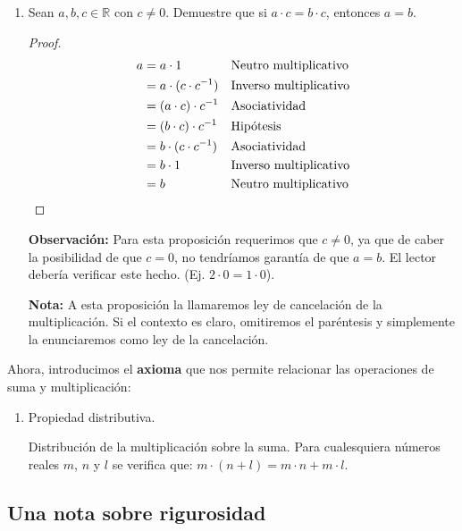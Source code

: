 \documentclass[11pt]{article}
\newcommand{\R}{\mathbb{R}}
\begin{document}
\begin{enumerate}[label=\alph*)]
    \item Sean $a,b,c\in \R$ con $c\neq 0$. Demuestre que si $a\cdot c=b\cdot c$, entonces $a=b$.
    \vspace{-1em}\begin{proof} 
        \begin{align*}
            a &= a\cdot 1 && \text{Neutro multiplicativo}\\
            &= a \cdot (c\cdot c^{-1}) && \text{Inverso multiplicativo}\\
            &= (a \cdot c) \cdot c^{-1} && \text{Asociatividad}\\
            &= (b \cdot c) \cdot c^{-1} && \text{Hipótesis}\\
            &= b \cdot (c\cdot c^{-1}) && \text{Asociatividad}\\
            &= b \cdot 1 && \text{Inverso multiplicativo}\\
            &= b && \text{Neutro multiplicativo}\qedhere
            \end{align*}    
    \end{proof} \vspace{-1em}
    \textbf{Observación:} Para esta proposición requerimos que $c\neq 0$, ya que de caber la posibilidad de que $c=0$, no tendríamos garantía de que $a=b$. El lector debería verificar este hecho. (Ej. $2\cdot 0 = 1 \cdot 0$).

    \textbf{Nota:} A esta proposición la llamaremos ley de cancelación de la multiplicación. Si el contexto es claro, omitiremos el paréntesis y simplemente la enunciaremos como ley de la cancelación.
    \end{enumerate}

    Ahora, introducimos el \textbf{axioma} que nos permite relacionar las operaciones de suma y multiplicación:

\begin{enumerate}[label=P.D.]
    \item Propiedad distributiva.
    
    Distribución de la multiplicación sobre la suma. Para cualesquiera números reales $m$, $n$ y $l$ se verifica que: $ m \cdot (n+l)=m \cdot n+m \cdot l $.
\end{enumerate}

\pagebreak

\subsection*{Una nota sobre rigurosidad}
\end{document}
